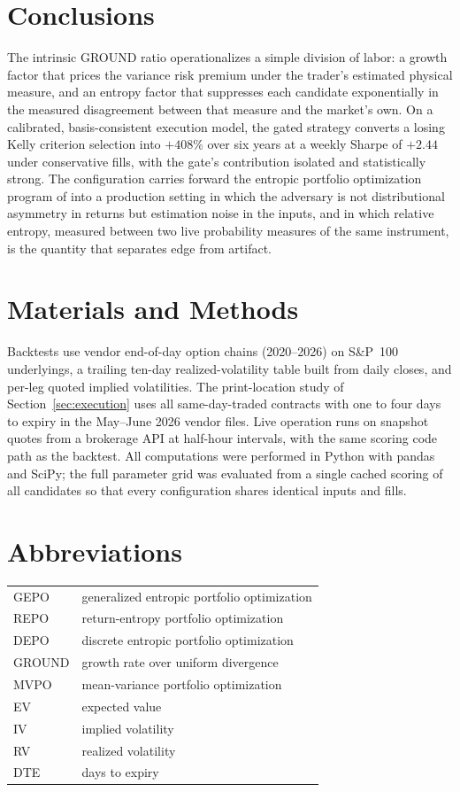 \documentclass[11pt]{article}
\begin{document}
\section{Conclusions}
\label{sec:conclusions}

The intrinsic GROUND ratio operationalizes a simple division of labor: a
growth factor that prices the variance risk premium under the trader's
estimated physical measure, and an entropy factor that suppresses each
candidate exponentially in the measured disagreement between that measure and
the market's own. On a calibrated, basis-consistent execution model, the
gated strategy converts a losing Kelly criterion selection into $+408\%$ over
six years at a weekly Sharpe of $+2.44$ under conservative fills, with the
gate's contribution isolated and statistically strong. The configuration
carries forward the entropic portfolio optimization program of
\cite{mercurio2020repo, mercurio2020binary, mercurio2020gepo} into a
production setting in which the adversary is not distributional asymmetry in
returns but estimation noise in the inputs, and in which relative entropy,
measured between two live probability measures of the same instrument, is the
quantity that separates edge from artifact.

\section*{Materials and Methods}

Backtests use vendor end-of-day option chains (2020--2026) on S\&P~100
underlyings, a trailing ten-day realized-volatility table built from daily
closes, and per-leg quoted implied volatilities. The print-location study of
Section~\ref{sec:execution} uses all same-day-traded contracts with one to
four days to expiry in the May--June 2026 vendor files. Live operation runs
on snapshot quotes from a brokerage API at half-hour intervals, with the same
scoring code path as the backtest. All computations were performed in Python
with pandas and SciPy; the full parameter grid was evaluated from a single
cached scoring of all candidates so that every configuration shares identical
inputs and fills.

\section*{Abbreviations}

\begin{tabular}{ll}
GEPO & generalized entropic portfolio optimization \\
REPO & return-entropy portfolio optimization \\
DEPO & discrete entropic portfolio optimization \\
GROUND & growth rate over uniform divergence \\
MVPO & mean-variance portfolio optimization \\
EV & expected value \\
IV & implied volatility \\
RV & realized volatility \\
DTE & days to expiry \\
\end{tabular}
\end{document}
